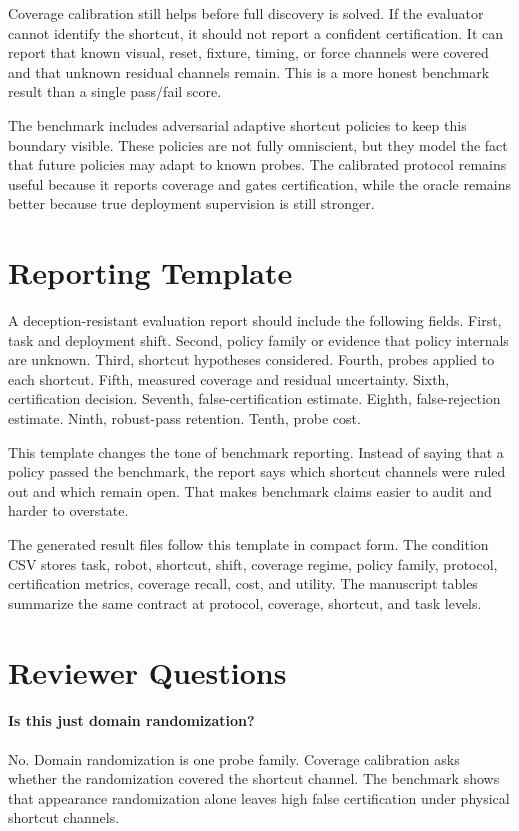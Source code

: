 \documentclass{article}
\begin{document}
Coverage calibration still helps before full discovery is solved. If the evaluator cannot identify the shortcut, it should not report a confident certification. It can report that known visual, reset, fixture, timing, or force channels were covered and that unknown residual channels remain. This is a more honest benchmark result than a single pass/fail score.

The benchmark includes adversarial adaptive shortcut policies to keep this boundary visible. These policies are not fully omniscient, but they model the fact that future policies may adapt to known probes. The calibrated protocol remains useful because it reports coverage and gates certification, while the oracle remains better because true deployment supervision is still stronger.

\clearpage
\section{Reporting Template}

A deception-resistant evaluation report should include the following fields. First, task and deployment shift. Second, policy family or evidence that policy internals are unknown. Third, shortcut hypotheses considered. Fourth, probes applied to each shortcut. Fifth, measured coverage and residual uncertainty. Sixth, certification decision. Seventh, false-certification estimate. Eighth, false-rejection estimate. Ninth, robust-pass retention. Tenth, probe cost.

This template changes the tone of benchmark reporting. Instead of saying that a policy passed the benchmark, the report says which shortcut channels were ruled out and which remain open. That makes benchmark claims easier to audit and harder to overstate.

The generated result files follow this template in compact form. The condition CSV stores task, robot, shortcut, shift, coverage regime, policy family, protocol, certification metrics, coverage recall, cost, and utility. The manuscript tables summarize the same contract at protocol, coverage, shortcut, and task levels.

\clearpage
\section{Reviewer Questions}

\paragraph{Is this just domain randomization?}
No. Domain randomization is one probe family. Coverage calibration asks whether the randomization covered the shortcut channel. The benchmark shows that appearance randomization alone leaves high false certification under physical shortcut channels.
\end{document}
